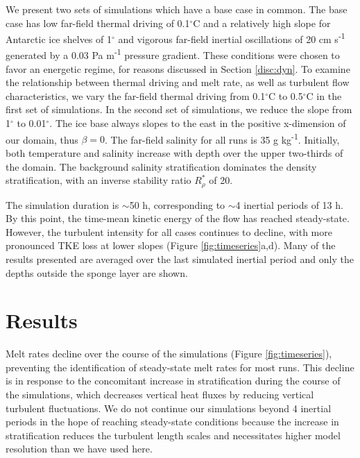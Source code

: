\documentclass[draft]{agujournal2019}
\begin{document}
We present two sets of simulations which have a base case in common. The base case has low far-field thermal driving of 0.1$^{\circ}$C and a relatively high slope for Antarctic ice shelves of 1$^{\circ}$ and vigorous far-field inertial oscillations of 20 cm s\textsuperscript{-1} generated by a 0.03 Pa m\textsuperscript{-1} pressure gradient. These conditions were chosen to favor an energetic regime, for reasons discussed in Section \ref{disc:dyn}. To examine the relationship between thermal driving and melt rate, as well as turbulent flow characteristics, we vary the far-field thermal driving from 0.1$^{\circ}$C to 0.5$^{\circ}$C in the first set of simulations. In the second set of simulations, we reduce the slope from 1$^{\circ}$ to 0.01$^{\circ}$. The ice base always slopes to the east in the positive x-dimension of our domain, thus $\beta = 0$. The far-field salinity for all runs is 35 g kg\textsuperscript{-1}. Initially, both temperature and salinity increase with depth over the upper two-thirds of the domain. The background salinity stratification dominates the density stratification, with an inverse stability ratio $R_\rho^*$ of 20. 

The simulation duration is $\sim$50 h, corresponding to $\sim$4 inertial periods of 13 h. By this point, the time-mean kinetic energy of the flow has reached steady-state. However, the turbulent intensity for all cases continues to decline, with more pronounced TKE loss at lower slopes (Figure \ref{fig:timeseries}a,d). Many of the results presented are averaged over the last simulated inertial period and only the depths outside the sponge layer are shown.




\section{Results}

Melt rates decline over the course of the simulations (Figure \ref{fig:timeseries}), preventing the identification of steady-state melt rates for most runs. This decline is in response to the concomitant increase in stratification during the course of the simulations, which decreases vertical heat fluxes by reducing vertical turbulent fluctuations. We do not continue our simulations beyond 4 inertial periods in the hope of reaching steady-state conditions because the increase in stratification reduces the turbulent length scales and necessitates higher model resolution than we have used here. 
\end{document}
